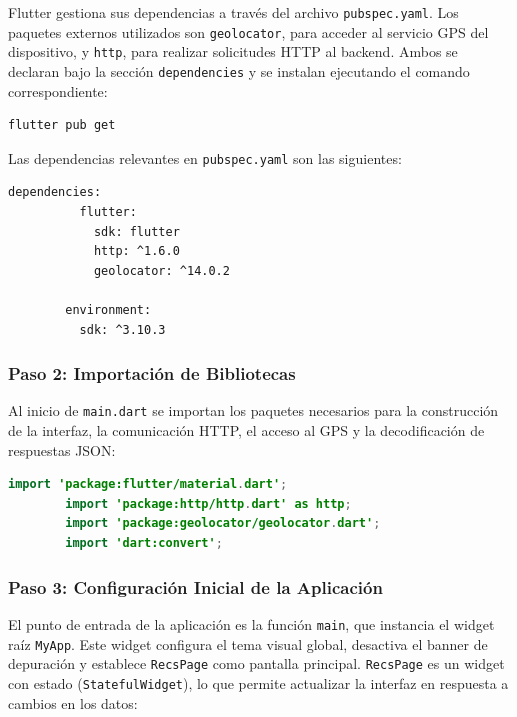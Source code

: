 \documentclass[11pt, letterpaper]{article}
\begin{document}
	Flutter gestiona sus dependencias a través del archivo \texttt{pubspec.yaml}.
	Los paquetes externos utilizados son \texttt{geolocator}, para acceder al
	servicio GPS del dispositivo, y \texttt{http}, para realizar solicitudes
	HTTP al backend. Ambos se declaran bajo la sección \texttt{dependencies} y
	se instalan ejecutando el comando correspondiente:
	
	\begin{lstlisting}[language=bash, caption=Instalación de dependencias en Flutter]
		flutter pub get
	\end{lstlisting}
	
	Las dependencias relevantes en \texttt{pubspec.yaml} son las siguientes:
	
	\begin{lstlisting}[caption=Dependencias en pubspec.yaml]
		dependencies:
		  flutter:
		    sdk: flutter
		    http: ^1.6.0
		    geolocator: ^14.0.2
		
		environment:
		  sdk: ^3.10.3
	\end{lstlisting}
	
	\subsubsection{Paso 2: Importación de Bibliotecas}
	
	Al inicio de \texttt{main.dart} se importan los paquetes necesarios para
	la construcción de la interfaz, la comunicación HTTP, el acceso al GPS y
	la decodificación de respuestas JSON:
	
	\begin{lstlisting}[language=Java, caption=Importaciones en main.dart]
		import 'package:flutter/material.dart';
		import 'package:http/http.dart' as http;
		import 'package:geolocator/geolocator.dart';
		import 'dart:convert';
	\end{lstlisting}
	
	\subsubsection{Paso 3: Configuración Inicial de la Aplicación}
	
	El punto de entrada de la aplicación es la función \texttt{main}, que
	instancia el widget raíz \texttt{MyApp}. Este widget configura el tema
	visual global, desactiva el banner de depuración y establece
	\texttt{RecsPage} como pantalla principal. \texttt{RecsPage} es un widget
	con estado (\texttt{StatefulWidget}), lo que permite actualizar la interfaz
	en respuesta a cambios en los datos:
	
\end{document}
